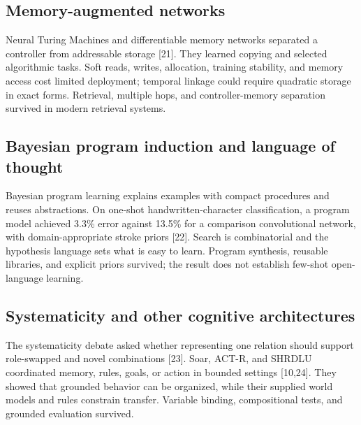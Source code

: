 \subsection{Memory-augmented networks}
Neural Turing Machines and differentiable memory networks separated a controller from addressable storage [21]. They learned copying and selected algorithmic tasks. Soft reads, writes, allocation, training stability, and memory access cost limited deployment; temporal linkage could require quadratic storage in exact forms. Retrieval, multiple hops, and controller-memory separation survived in modern retrieval systems.

\subsection{Bayesian program induction and language of thought}
Bayesian program learning explains examples with compact procedures and reuses abstractions. On one-shot handwritten-character classification, a program model achieved 3.3\% error against 13.5\% for a comparison convolutional network, with domain-appropriate stroke priors [22]. Search is combinatorial and the hypothesis language sets what is easy to learn. Program synthesis, reusable libraries, and explicit priors survived; the result does not establish few-shot open-language learning.

\subsection{Systematicity and other cognitive architectures}
The systematicity debate asked whether representing one relation should support role-swapped and novel combinations [23]. Soar, ACT-R, and SHRDLU coordinated memory, rules, goals, or action in bounded settings [10,24]. They showed that grounded behavior can be organized, while their supplied world models and rules constrain transfer. Variable binding, compositional tests, and grounded evaluation survived.

